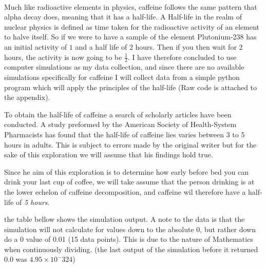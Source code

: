 \documentclass[12pt]{article}
\begin{document}
        \paragraph{}
                Much like radioactive elements in physics, caffeine follows the same pattern that alpha decay does, meaning that it has a half-life. A Half-life in the realm of nuclear physics is defined as time taken for the radioactive activity of an element to halve itself. So if we were to have a sample of the element Plutonium-238 has an initial activity of $1$ and a half life of 2 hours. Then if you then wait for 2 hours, the activity is now going to be {$\frac{1}{2}$}. I have therefore concluded to use computer simulations as my data collection, and since there are no available simulations specifically for caffeine I will collect data from a simple python program which will apply the principles of the half-life (Raw code is attached to the appendix). 

                \noindent To obtain the half-life of caffeine a search of scholarly articles have been conducted. A study preformed by the American Society of Health-System Pharmacists has found that the half-life of caffeine lies varies between 3 to 5 hours in adults. 
                This is subject to errors made by the original writer but for the sake of this exploration we will assume that his findings hold true. 
                
                \noindent
                Since he aim of this exploration is  to determine how early before bed you can drink your last cup of coffee, we will take assume that the person drinking is at the lower echelon of caffeine decomposition, and caffeine wil therefore have a half-life of \textit{5 hours}. 
                
                \noindent the table bellow shows the simulation output. A note to the data is that the simulation will not calculate for values down to the absolute 0, but rather down do a 0 value of 0.01 (15 data points). This is due to the nature of Mathematics when continuously dividing. (the last output of the simulation before it returned 0.0 was $4.95\times 10^-324$)
\end{document}
